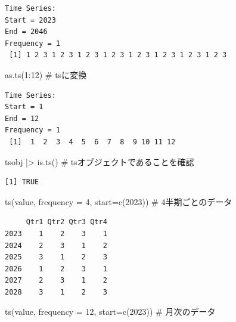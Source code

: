 \documentclass[
  letterpaper,
  DIV=11,
  numbers=noendperiod]{scrreprt}
\newenvironment{Shaded}{\begin{snugshade}}{\end{snugshade}}
\newcommand{\AttributeTok}[1]{\textcolor[rgb]{0.40,0.45,0.13}{#1}}
\newcommand{\CommentTok}[1]{\textcolor[rgb]{0.37,0.37,0.37}{#1}}
\newcommand{\DecValTok}[1]{\textcolor[rgb]{0.68,0.00,0.00}{#1}}
\newcommand{\FunctionTok}[1]{\textcolor[rgb]{0.28,0.35,0.67}{#1}}
\newcommand{\NormalTok}[1]{\textcolor[rgb]{0.00,0.23,0.31}{#1}}
\newcommand{\SpecialCharTok}[1]{\textcolor[rgb]{0.37,0.37,0.37}{#1}}
\begin{document}
\begin{verbatim}
Time Series:
Start = 2023 
End = 2046 
Frequency = 1 
 [1] 1 2 3 1 2 3 1 2 3 1 2 3 1 2 3 1 2 3 1 2 3 1 2 3
\end{verbatim}

\begin{Shaded}
\begin{Highlighting}[]
\FunctionTok{as.ts}\NormalTok{(}\DecValTok{1}\SpecialCharTok{:}\DecValTok{12}\NormalTok{) }\CommentTok{\# tsに変換}
\end{Highlighting}
\end{Shaded}

\begin{verbatim}
Time Series:
Start = 1 
End = 12 
Frequency = 1 
 [1]  1  2  3  4  5  6  7  8  9 10 11 12
\end{verbatim}

\begin{Shaded}
\begin{Highlighting}[]
\NormalTok{tsobj }\SpecialCharTok{|\textgreater{}} \FunctionTok{is.ts}\NormalTok{() }\CommentTok{\# tsオブジェクトであることを確認}
\end{Highlighting}
\end{Shaded}

\begin{verbatim}
[1] TRUE
\end{verbatim}

\begin{Shaded}
\begin{Highlighting}[]
\FunctionTok{ts}\NormalTok{(value, }\AttributeTok{frequency =} \DecValTok{4}\NormalTok{, }\AttributeTok{start=}\FunctionTok{c}\NormalTok{(}\DecValTok{2023}\NormalTok{)) }\CommentTok{\# 4半期ごとのデータ}
\end{Highlighting}
\end{Shaded}

\begin{verbatim}
     Qtr1 Qtr2 Qtr3 Qtr4
2023    1    2    3    1
2024    2    3    1    2
2025    3    1    2    3
2026    1    2    3    1
2027    2    3    1    2
2028    3    1    2    3
\end{verbatim}

\begin{Shaded}
\begin{Highlighting}[]
\FunctionTok{ts}\NormalTok{(value, }\AttributeTok{frequency =} \DecValTok{12}\NormalTok{, }\AttributeTok{start=}\FunctionTok{c}\NormalTok{(}\DecValTok{2023}\NormalTok{)) }\CommentTok{\# 月次のデータ}
\end{Highlighting}
\end{Shaded}
\end{document}
